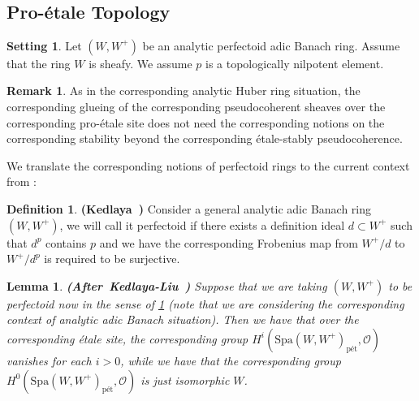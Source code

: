 \documentclass[12pt]{amsart}
\newtheorem{lemma}[theorem]{Lemma}
\theoremstyle{definition}
\newtheorem{definition}[theorem]{Definition}
\newtheorem{remark}[theorem]{Remark}
\numberwithin{equation}{section}
\newtheorem{setting}[theorem]{Setting}
\begin{document}
\



\subsection{Pro-\'etale Topology}


\begin{setting}
Let $(W,W^+)$ be an analytic perfectoid adic Banach ring. Assume that the ring $W$ is sheafy.	We assume $p$ is a topologically nilpotent element.
\end{setting}



\begin{remark}
As in the corresponding analytic Huber ring situation, the corresponding glueing of the corresponding pseudocoherent sheaves over the corresponding pro-\'etale site does not need the corresponding notions on the corresponding stability beyond the corresponding \'etale-stably pseudocoherence.	
\end{remark}


\indent We translate the corresponding notions of perfectoid rings to the current context from \cite[Definition 2.1.1]{Ked1}:


\begin{definition}\mbox{\bf{(Kedlaya \cite[Definition 2.1.1]{Ked1})}}     \label{definition5.10}
Consider a general analytic adic Banach ring $(W,W^+)$, we will call it perfectoid if there exists a definition ideal $d\subset W^+$ such that $d^p$ contains $p$ and we have the corresponding Frobenius map from $W^+/d$ to $W^+/d^p$ is required to be surjective.	
\end{definition}









\begin{lemma} \mbox{\bf{(After Kedlaya-Liu \cite[Proposition 3.4.3]{KL2})}}
Suppose that we are taking $(W,W^+)$ to be perfectoid now in the sense of \cref{definition5.10} (note that we are considering the corresponding context of analytic adic Banach situation). Then we have that over the corresponding \'etale site, the corresponding group $H^i(\mathrm{Spa}(W,W^+)_\text{p\'et},\mathcal{O})$ vanishes for each $i>0$, while we have that the corresponding group $H^0(\mathrm{Spa}(W,W^+)_\text{p\'et},\mathcal{O})$ is just isomorphic $W$.	
\end{lemma}
\end{document}
